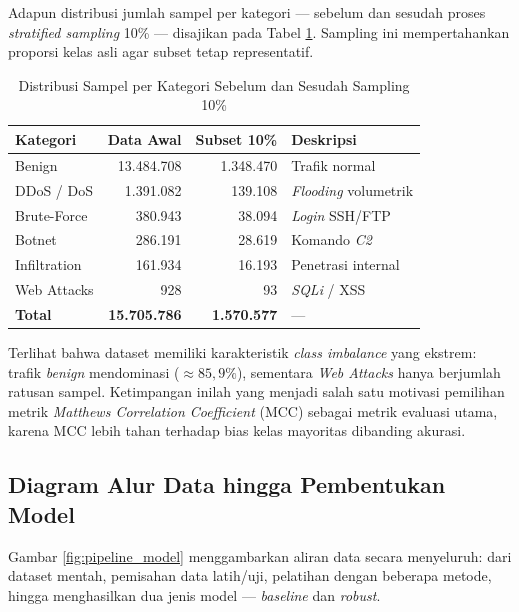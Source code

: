 \documentclass[11pt, a4paper]{article}
\begin{document}
Adapun distribusi jumlah sampel per kategori --- sebelum dan sesudah proses \textit{stratified sampling} 10\% --- disajikan pada Tabel \ref{tab:dataset_dist}. Sampling ini mempertahankan proporsi kelas asli agar subset tetap representatif.

\begin{table}[htbp]
\centering
\caption{Distribusi Sampel per Kategori Sebelum dan Sesudah Sampling 10\%}
\label{tab:dataset_dist}
\small
\begin{tabularx}{\linewidth}{@{} l r r X @{}}
\toprule
\textbf{Kategori} & \textbf{Data Awal} & \textbf{Subset 10\%} & \textbf{Deskripsi} \\ \midrule
Benign & 13.484.708 & 1.348.470 & Trafik normal \\ \addlinespace
DDoS / DoS & 1.391.082 & 139.108 & \textit{Flooding} volumetrik \\ \addlinespace
Brute-Force & 380.943 & 38.094 & \textit{Login} SSH/FTP \\ \addlinespace
Botnet & 286.191 & 28.619 & Komando \textit{C2} \\ \addlinespace
Infiltration & 161.934 & 16.193 & Penetrasi internal \\ \addlinespace
Web Attacks & 928 & 93 & \textit{SQLi} / XSS \\ \midrule
\textbf{Total} & \textbf{15.705.786} & \textbf{1.570.577} & --- \\ \bottomrule
\end{tabularx}
\end{table}

Terlihat bahwa dataset memiliki karakteristik \textit{class imbalance} yang ekstrem: trafik \textit{benign} mendominasi ($\approx 85{,}9\%$), sementara \textit{Web Attacks} hanya berjumlah ratusan sampel. Ketimpangan inilah yang menjadi salah satu motivasi pemilihan metrik \textit{Matthews Correlation Coefficient} (MCC) sebagai metrik evaluasi utama, karena MCC lebih tahan terhadap bias kelas mayoritas dibanding akurasi.

\subsection{Diagram Alur Data hingga Pembentukan Model}
Gambar \ref{fig:pipeline_model} menggambarkan aliran data secara menyeluruh: dari dataset mentah, pemisahan data latih/uji, pelatihan dengan beberapa metode, hingga menghasilkan dua jenis model --- \textit{baseline} dan \textit{robust}.
\end{document}

